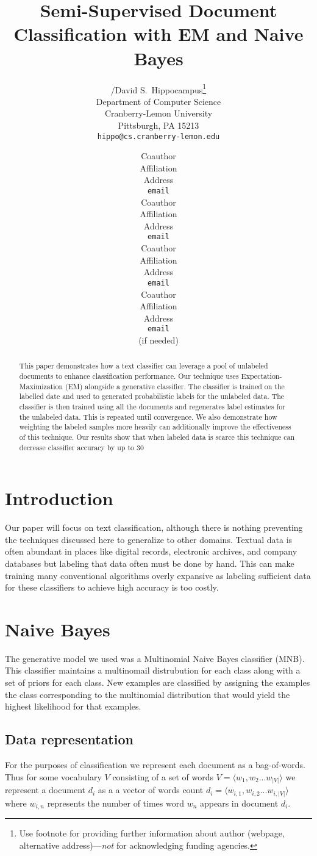 \documentclass{article} %
\title{Semi-Supervised Document Classification with EM and Naive Bayes}
\author{
/David S.~Hippocampus\thanks{ Use footnote for providing further information
about author (webpage, alternative address)---\emph{not} for acknowledging
funding agencies.} \\
Department of Computer Science\\
Cranberry-Lemon University\\
Pittsburgh, PA 15213 \\
\texttt{hippo@cs.cranberry-lemon.edu} \\
\and
Coauthor \\
Affiliation \\
Address \\
\texttt{email} \\
\AND
Coauthor \\
Affiliation \\
Address \\
\texttt{email} \\
\And
Coauthor \\
Affiliation \\
Address \\
\texttt{email} \\
\And
Coauthor \\
Affiliation \\
Address \\
\texttt{email} \\
(if needed)\\
}
\begin{document}
\maketitle

\begin{abstract}
This paper demonstrates how a text classifier can leverage a pool of unlabeled documents 
to enhance classification performance. Our technique uses Expectation-Maximization (EM) alongside a generative
classifier. The classifier is trained on the labelled date and used to generated probabilistic labels for the unlabeled
data. The classifier is then trained using all the documents and regenerates label estimates for the unlabeled data.
This is repeated until convergence. We also demonstrate how weighting the labeled samples more heavily 
can additionally improve the effectiveness of this technique. Our results show that when labeled data is scarce
this technique can decrease classifier accuracy by up to 30%
\end{abstract}

\section{Introduction}
Our paper will focus on text classification, although there is nothing preventing the techniques discussed here to 
generalize to other domains. Textual data is often abundant in places like digital records, electronic archives, 
and company databases but labeling that data often must be done by hand. This can make training many
conventional algorithms overly expansive as labeling sufficient data for 
these classifiers to achieve high accuracy is too costly. 

\section{Naive Bayes}
The generative model we used was a Multinomial Naive Bayes classifier (MNB). This classifier 
maintains a multinomail distrubution for each class along with a set of priors for each class. New
examples are classified by assigning the examples the class corresponding to the multinomial distribution that would
yield the highest likelihood for that examples. 
\subsection{Data representation}
For the purposes of classification we represent each document as a bag-of-words. Thus for some vocabulary $V$ consisting of
a set of words $V = \langle{w_1,w_2...w_{|V|}}\rangle$ we represent a document $d_i$ as a
a vector of words count $d_i = \langle{w_{i,1},w_{i,2}...w_{i,|V|}}\rangle$ where $w_{i,n}$ represents
the number of times word $w_n$ appears in document  $d_i$.
 
\end{document}
